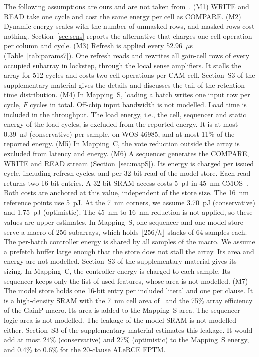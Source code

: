 \documentclass[preprint,review,12pt]{elsarticle}
\newcommand{\gainp}{GainP}
\newcommand{\hyp}[1]{#1}   %
\newcommand{\wosnew}[1]{#1}   %
\begin{document}
\hyp{The following assumptions are ours and are not taken from~\cite{levi2026gainp}.
(M1) WRITE and READ take one cycle and cost the same energy per cell as COMPARE.
(M2) Dynamic energy scales with the number of unmasked rows, and masked rows cost nothing. Section~\ref{sec:sens} reports the alternative that charges one cell operation per column and cycle.
(M3) Refresh is applied every 52.96~$\mu$s (Table~\ref{tab:params7}). One refresh reads and rewrites all gain-cell rows of every occupied subarray in lockstep, through the local sense amplifiers. It stalls the array for 512 cycles and costs two cell operations per CAM cell.} \wosnew{Section~S3 of the supplementary material gives the details and discusses the tail of the retention time distribution.} \hyp{
(M4) In Mapping~S, loading a batch writes one input row per cycle, $F$ cycles in total. Off-chip input bandwidth is not modelled. Load time is included in the throughput. The load energy, i.e., the cell, sequencer and static energy of the load cycles, is excluded from the reported energy. It is at most 0.39~nJ (conservative) per sample, on WOS-46985, and at most 11\% of the reported energy.} \hyp{
(M5) In Mapping~C, the vote reduction outside the array is excluded from latency and energy.
(M6) A sequencer generates the COMPARE, WRITE and READ stream (Section~\ref{sec:mapS}). Its energy is charged per issued cycle, including refresh cycles, and per 32-bit read of the model store. Each read returns two 16-bit entries.} A 32-bit SRAM access costs 5~pJ in 45~nm CMOS~\cite{han2016deep}. \hyp{Both costs are anchored at this value, independent of the store size. The 16~nm reference points use 5~pJ. At the 7~nm corners, we assume 3.70~pJ (conservative) and 1.75~pJ (optimistic). The 45~nm to 16~nm reduction is not applied, so these values are upper estimates. In Mapping~S, one sequencer and one model store serve a macro of 256 subarrays, which holds $\lfloor 256/h\rfloor$ stacks of 64 samples each. The per-batch controller energy is shared by all samples of the macro. We assume a prefetch buffer large enough that the store does not stall the array. Its area and energy are not modelled.} \wosnew{Section~S3 of the supplementary material gives its sizing.} \hyp{ In Mapping~C, the controller energy is charged to each sample. Its sequencer keeps only the list of used features, whose area is not modelled.
(M7) The model store holds one 16-bit entry per included literal and one per clause. It is a high-density SRAM with the 7~nm cell area of~\cite{wu2016n7} and the 75\% array efficiency of the \gainp{} macro. Its area is added to the Mapping~S area. The sequencer logic area is not modelled. The leakage of the model SRAM is not modelled either.} \wosnew{Section~S3 of the supplementary material estimates this leakage. It would add at most} \hyp{24\%} \wosnew{(conservative) and} \hyp{27\%} \wosnew{(optimistic) to the Mapping~S energy, and} \hyp{0.4\% to 0.6\%} \wosnew{for the 20-clause ALeRCE FPTM.}
\end{document}
